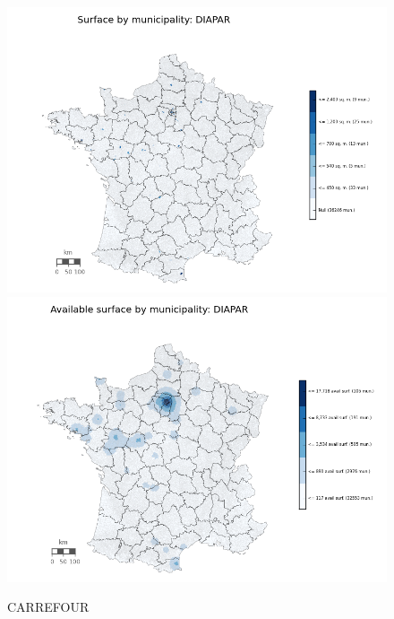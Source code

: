 \documentclass[11pt]{article}
\begin{document}
\begin{figure}[H]
    \caption{CARREFOUR}
	\centering
		\includegraphics[width=15cm]{images/maps_surface/DIAPAR.png}
        \includegraphics[width=15cm]{images/maps_available_surface/DIAPAR.png}
\end{figure}
\end{document}
